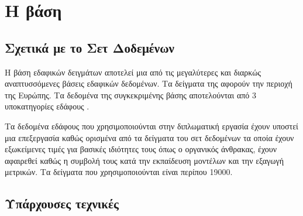 \chapter{Η βάση  }

\section{Σχετικά με το Σετ Δοδεμένων}
Η βάση εδαφικών δειγμάτων  αποτελεί μια από τις μεγαλύτερες και διαρκώς αναπτυσσόμενες βάσεις εδαφικών δεδομένων. Τα δείγματα της αφορούν την περιοχή της Ευρώπης. Τα δεδομένα της συγκεκριμένης βάσης αποτελούνται από 3 υποκατηγορίες εδάφους .

Τα δεδομένα εδάφους που χρησιμοποιούνται στην διπλωματική εργασία έχουν υποστεί μια επεξεργασία καθώς ορισμένα από τα δείγματα του σετ δεδομένων τα οποία έχουν εξωκείμενες τιμές για βασικές ιδιότητες τους όπως ο οργανικός άνθρακας, έχουν αφαιρεθεί καθώς η συμβολή τους κατά την εκπαίδευση μοντέλων και την εξαγωγή μετρικών. Τα δείγματα που χρησιμοποιούνται είναι περίπου 19000.

\section{Υπάρχουσες τεχνικές}